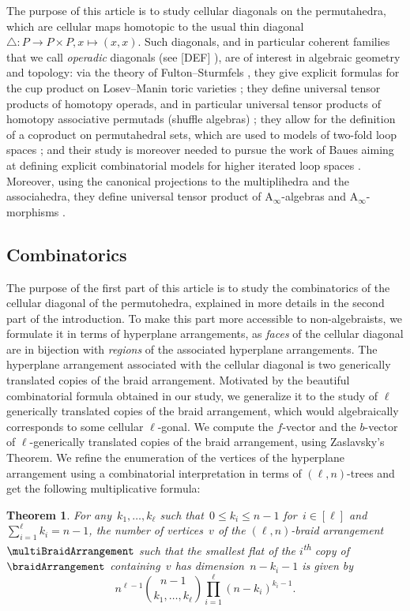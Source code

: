 \documentclass{amsart}
\newcommand{\Guillaume}[1]{\todo[color=magenta!30]{\rm #1 \\ \hfill --- G.}}
\newcommand{\BDO}[1]{\todo[color=green!30]{\rm #1 \\ \hfill --- B.}}
\newtheorem{theorem}{Theorem}[section]
\theoremstyle{definition}
\newcommand{\ordinal}{\textsuperscript{th}} %
\newcommand{\Ainf}{\ensuremath{\mathrm{A}_\infty}}
\begin{document}
The purpose of this article is to study cellular diagonals on the permutahedra, which are cellular maps homotopic to the usual thin diagonal $\triangle : P \to P \times P, x \mapsto (x,x)$.
Such diagonals, and in particular coherent families that we call \emph{operadic} diagonals (see [DEF] \BDO{Reference ?}), are of interest in algebraic geometry and topology: via the theory of Fulton--Sturmfels \cite{fultonIntersectionTheoryToric1997a}, they give explicit formulas for the cup product on Losev--Manin toric varieties \cite{losevNewModuliSpaces2000}; they define universal tensor products of homotopy operads, and in particular universal tensor products of homotopy associative permutads (shuffle algebras) \cite{LA21}; they allow for the definition of a coproduct on permutahedral sets, which are used to models of two-fold loop spaces \cite{SaneblidzeUmble04}; and their study is moreover needed to pursue the work of Baues aiming at defining explicit combinatorial models for higher iterated loop spaces \cite{bauesGeometryLoopSpaces1980}. 
Moreover, using the canonical projections to the multiplihedra and the associahedra, they define universal tensor product of $\Ainf$-algebras and $\Ainf$-morphisms \cite{MazuirLA22}.
\Guillaume{lien avec les matroides?}


\subsection*{Combinatorics}

The purpose of the first part of this article is to study the combinatorics of the cellular diagonal of the permutohedra, explained in more details in the second part of the introduction.
 To make this part more accessible to non-algebraists, we formulate it in terms of hyperplane arrangements, as \emph{faces} of the cellular diagonal are in bijection with \emph{regions} of the associated hyperplane arrangements. 
 The hyperplane arrangement associated with  the cellular diagonal is two generically translated copies of the braid arrangement. 
 Motivated by the beautiful combinatorial formula obtained in our study, we generalize it to the study of $\ell$ generically translated copies of the braid arrangement, which would algebraically corresponds to some cellular $\ell$-gonal.
  We compute the $f$-vector and the $b$-vector of $\ell$-generically translated copies of the braid arrangement, using Zaslavsky's Theorem. 
  We refine the enumeration of the vertices of the hyperplane arrangement using a combinatorial interpretation in terms of $(\ell, n)$-trees and get the following multiplicative formula:
\begin{theorem}
For any~$k_1, \dots, k_\ell$ such that~$0 \le k_i \le n-1$ for~$i \in [\ell]$ and~${\sum_{i=1}^\ell k_i = n-1}$, the number of vertices~$v$ of the $(\ell,n)$-braid arrangement~$\multiBraidArrangement$ such that the smallest flat of the $i$\ordinal{} copy of~$\braidArrangement$ containing~$v$ has dimension~$n-k_i-1$ is given by
\[
n^{\ell-1} \binom{n-1}{k_1, \dots, k_\ell} \prod_{i=1}^\ell (n-k_i)^{k_i-1}.
\]
\end{theorem}
\end{document}
